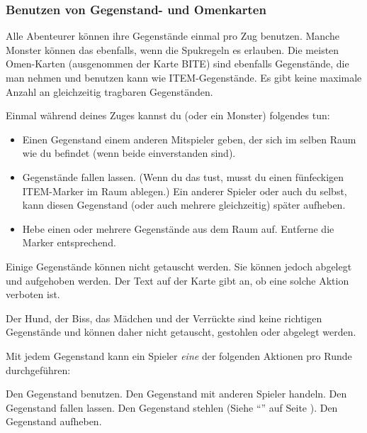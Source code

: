%
%
%

\subsubsection{Benutzen von Gegenstand- und Omenkarten}
\label{kap:rule:useitemomen}

Alle Abenteurer können ihre Gegenstände einmal pro Zug benutzen. Manche Monster können das ebenfalls, wenn die Spukregeln es erlauben. Die meisten Omen-Karten (ausgenommen der Karte BITE) sind ebenfalls Gegenstände, die man nehmen und benutzen kann wie ITEM-Gegenstände. Es gibt keine maximale Anzahl an gleichzeitig tragbaren Gegenständen.

Einmal während deines Zuges kannst du (oder ein Monster) folgendes tun:
  \begin{itemize}
    \item Einen Gegenstand einem anderen Mitspieler geben, der sich im selben Raum wie du befindet (wenn beide einverstanden sind).
    \item Gegenstände fallen lassen. (Wenn du das tust, musst du einen fünfeckigen ITEM-Marker im Raum ablegen.) Ein anderer Spieler oder auch du selbst, kann diesen Gegenstand (oder auch mehrere gleichzeitig) später aufheben.
    \item Hebe einen oder mehrere Gegenstände aus dem Raum auf. Entferne die Marker entsprechend.
\end{itemize}

Einige Gegenstände können nicht getauscht werden. Sie können jedoch abgelegt und aufgehoben werden. Der Text auf der Karte gibt an, ob eine solche Aktion verboten ist.

Der Hund, der Biss, das Mädchen und der Verrückte sind keine richtigen Gegenstände und können daher nicht getauscht, gestohlen oder abgelegt werden.

Mit jedem Gegenstand kann ein Spieler \emph{eine} der folgenden Aktionen pro Runde durchgeführen:

  \begin{itemize}
        \bitem Den Gegenstand benutzen.
        \bitem Den Gegenstand mit anderen Spieler handeln.
        \bitem Den Gegenstand fallen lassen.
        \bitem Den Gegenstand stehlen (Siehe ``'' auf Seite \pageref{kap:rule:specialattack}).
        \bitem Den Gegenstand aufheben.
  \end{itemize}

